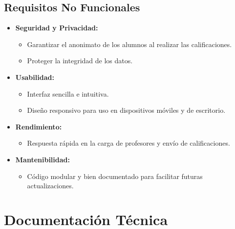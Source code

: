 \documentclass[11pt]{article}
\begin{document}
\subsection{Requisitos No Funcionales}
\begin{itemize}
    \item \textbf{Seguridad y Privacidad:}
    \begin{itemize}
        \item Garantizar el anonimato de los alumnos al realizar las calificaciones.
        \item Proteger la integridad de los datos.
    \end{itemize}
    \item \textbf{Usabilidad:}
    \begin{itemize}
        \item Interfaz sencilla e intuitiva.
        \item Diseño responsivo para uso en dispositivos móviles y de escritorio.
    \end{itemize}
    \item \textbf{Rendimiento:}
    \begin{itemize}
        \item Respuesta rápida en la carga de profesores y envío de calificaciones.
    \end{itemize}
    \item \textbf{Mantenibilidad:}
    \begin{itemize}
        \item Código modular y bien documentado para facilitar futuras actualizaciones.
    \end{itemize}
\end{itemize}

\section{Documentación Técnica}
\end{document}
